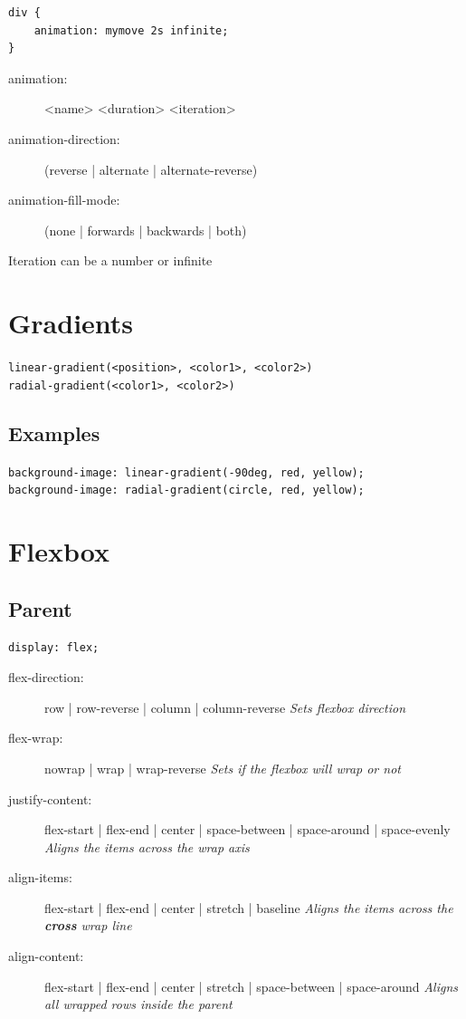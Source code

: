 \documentclass[12pt, a4paper]{article}
\begin{document}
\begin{multicols}{2}
\begin{center}
\begin{minipage}{0.9\linewidth}
\begin{lstlisting}
div {
	animation: mymove 2s infinite;
}
				\end{lstlisting}
			\end{minipage}
		\end{center}
		\begin{description}
			\item[animation:] <name> <duration> <iteration>
			\item[animation-direction:] (reverse | alternate | alternate-reverse)
			\item[animation-fill-mode:] (none | forwards | backwards | both)
		\end{description}
		Iteration can be a number or infinite
		
		\section{Gradients}
		\texttt{linear-gradient(<position>, <color1>, <color2>)}\\
		\texttt{radial-gradient(<color1>, <color2>)}\\
		\subsection{Examples}
		\texttt{background-image: linear-gradient(-90deg, red, yellow);}\\
		\texttt{background-image: radial-gradient(circle, red, yellow);}\\
		
		\section{Flexbox}
		\subsection{Parent}
		\texttt{display: flex;}
		\begin{description}
			\item[flex-direction:] row | row-reverse | column | column-reverse
			\subitem\textit{Sets flexbox direction}
			\item[flex-wrap:] nowrap | wrap | wrap-reverse
			\subitem\textit{Sets if the flexbox will wrap or not}
			\item[justify-content:] flex-start | flex-end | center | space-between | space-around | space-evenly
			\subitem\textit{Aligns the items across the wrap axis}
			\item[align-items:] flex-start | flex-end | center | stretch | baseline
			\subitem\textit{Aligns the items across the \textbf{cross} wrap line}
			\item[align-content:] flex-start | flex-end | center | stretch | space-between | space-around
			\subitem\textit{Aligns all wrapped rows inside the parent}
		\end{description}


\end{multicols}
\end{document}
